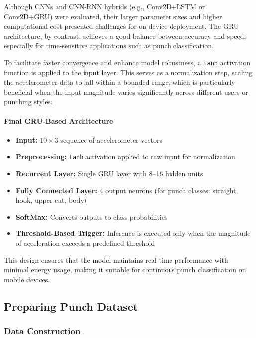 \documentclass{article}
\begin{document}
Although CNNs and CNN-RNN hybrids (e.g., Conv2D+LSTM or Conv2D+GRU) were evaluated, their larger parameter sizes and higher computational cost presented challenges for on-device deployment. The GRU architecture, by contrast, achieves a good balance between accuracy and speed, especially for time-sensitive applications such as punch classification.

To facilitate faster convergence and enhance model robustness, a \texttt{tanh} activation function is applied to the input layer. This serves as a normalization step, scaling the accelerometer data to fall within a bounded range, which is particularly beneficial when the input magnitude varies significantly across different users or punching styles.

\paragraph{Final GRU-Based Architecture}
\begin{itemize}
    \item \textbf{Input:} $10 \times 3$ sequence of accelerometer vectors
    \item \textbf{Preprocessing:} \texttt{tanh} activation applied to raw input for normalization
    \item \textbf{Recurrent Layer:} Single GRU layer with 8--16 hidden units
    \item \textbf{Fully Connected Layer:} 4 output neurons (for punch classes: straight, hook, upper cut, body)
    \item \textbf{SoftMax:} Converts outputs to class probabilities
    \item \textbf{Threshold-Based Trigger:} Inference is executed only when the magnitude of acceleration exceeds a predefined threshold
\end{itemize}

This design ensures that the model maintains real-time performance with minimal energy usage, making it suitable for continuous punch classification on mobile devices.






\subsection{Preparing Punch Dataset}

\subsubsection{Data Construction}
\end{document}
